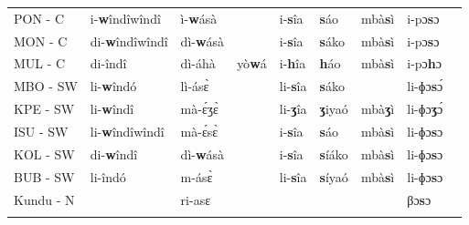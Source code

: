 \documentclass[output=paper,colorlinks,citecolor=brown
]{langscibook}
\begin{document}
\begin{table}
{\begin{tabular}{lllllllll}
PON - C                   & i-\textbf{w}îndîwîndî           & ì-\textbf{w}ásà              &                        & i-\textbf{s}îa                  & \textbf{s}áo                   & mbà\textbf{s}ì                & i-pɔ\textbf{s}ɔ                   \\
MON - C                   & di-\textbf{w}îndîwîndî          & dì-\textbf{w}ásà             &                        & i-\textbf{s}îa                  & \textbf{s}áko                  & mbà\textbf{s}ì                & i-pɔ\textbf{s}ɔ                   \\
MUL - C                   & di-îndî                & dì-áhà              & yò\textbf{w}á                 & i-\textbf{h}îa                  & \textbf{h}áo                   & mbà\textbf{s}ì                & i-pɔ\textbf{h}ɔ                   \\
MBO - SW                  & li-\textbf{w}îndó               & lì-ásɛ̀              &                        & li-\textbf{s}îa                 & \textbf{s}áko                  &                        & li-ɸɔ\textbf{s}ɔ́                 \\
KPE - SW                  & li-\textbf{w}îndî               & mà-ɛ́ʒɛ̀              &                        & li-\textbf{ʒ}îa                 & \textbf{ʒ}iyaó                 & mbà\textbf{ʒ}ì                & li-ɸɔ\textbf{ʒ}ɔ́                 \\
ISU - SW                  & li-\textbf{w}îndîwîndî          & mà-ɛ́sɛ̀              &                        & i-\textbf{s}îa                  & \textbf{s}áo                   & mbà\textbf{s}ì                & li-ɸɔ\textbf{s}ɔ                  \\
KOL - SW                  & di-\textbf{w}îndî               & dì-\textbf{w}ásà             &                        & i-\textbf{s}îa                  & \textbf{s}íáko                & mbà\textbf{s}ì                & li-ɸɔ\textbf{s}ɔ                  \\
BUB - SW                  & li-îndó                & m-ásɛ̀                &                        & li-\textbf{s}îa                 & \textbf{s}íyaó                & mbà\textbf{s}ì                & li-ɸɔ\textbf{s}ɔ                  \\
Kundu - N                 &                        & ri-asɛ                 &                        &                        &                        &                        & βɔ\textbf{s}ɔ                      \\ 
   \lspbottomrule
 \end{tabular}
 }
\end{table}
\end{document}
